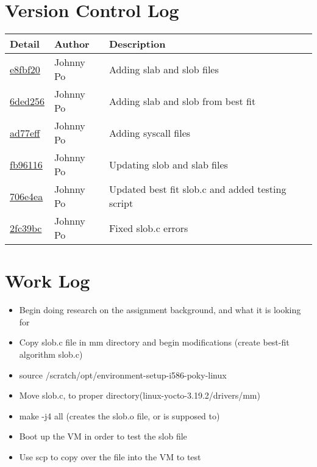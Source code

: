 \documentclass[onecolumn, draftclsnofoot,10pt, compsoc]{IEEEtran}
\begin{document}
\section{Version Control Log}
\begin{tabular}{l l l}\textbf{Detail} & \textbf{Author} & \textbf{Description}\\\hline

\href{https://github.com/jawhnypoh/Operating-Systems-II/commit/e8fbf20c5153a6da5856d5aaf66996695ce3e6c0#diff-15bd4745e12a2d3107c6423ab7df984b}{e8fbf20} & Johnny Po & Adding slab and slob files \\\hline
\href{https://github.com/jawhnypoh/Operating-Systems-II/commit/6ded256d261baa2aa2370bac5ff21e6795faf131#diff-15bd4745e12a2d3107c6423ab7df984b}{6ded256} & Johnny Po & Adding slab and slob from best fit \\\hline 
\href{https://github.com/jawhnypoh/Operating-Systems-II/commit/ad77eff948d13d24058266a4e33f3da330691db4#diff-15bd4745e12a2d3107c6423ab7df984b}{ad77eff} & Johnny Po & Adding syscall files \\\hline 
\href{https://github.com/jawhnypoh/Operating-Systems-II/commit/fb96116ab80963f1ca2cd2b64d5d3b8b5ba11648#diff-15bd4745e12a2d3107c6423ab7df984b}{fb96116} & Johnny Po & Updating slob and slab files\\\hline 
\href{https://github.com/jawhnypoh/Operating-Systems-II/commit/706e4ea960f803126e4725dcb7794d2b22273022#diff-15bd4745e12a2d3107c6423ab7df984b}{706e4ea} & Johnny Po & Updated best fit slob.c and added testing script\\\hline 
\href{https://github.com/jawhnypoh/Operating-Systems-II/commit/2fc39bc0732a9cc1edbba211ec2ff314afb70278#diff-15bd4745e12a2d3107c6423ab7df984b}{2fc39bc} & Johnny Po & Fixed slob.c errors\\\hline




\end{tabular}

\section{Work Log}
\begin{itemize}
\item Begin doing research on the assignment background, and what it is looking for 
\item Copy slob.c file in mm directory and begin modifications (create best-fit algorithm slob.c)
\item source /scratch/opt/environment-setup-i586-poky-linux
\item Move slob.c, to proper directory(linux-yocto-3.19.2/drivers/mm) 
\item make -j4 all (creates the slob.o file, or is supposed to)
\item Boot up the VM in order to test the slob file 
\item Use scp to copy over the file into the VM to test 
\end{itemize}


\clearpage
\end{document}
